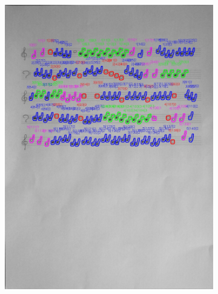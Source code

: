 \documentclass[11pt]{article}
\begin{document}
\begin{figure}[H]
    \centering
    \begin{subfigure}{.45\textwidth}
        \centering
        \graphicspath{ {blobs/} }
        \includegraphics[width=\linewidth]{13_cnts.jpg}
        \label{fig:sub1}
    \end{subfigure}%
    \begin{subfigure}{.45\textwidth}
        \centering
        \graphicspath{ {blobs/} }

\end{subfigure}
\end{figure}
\end{document}
